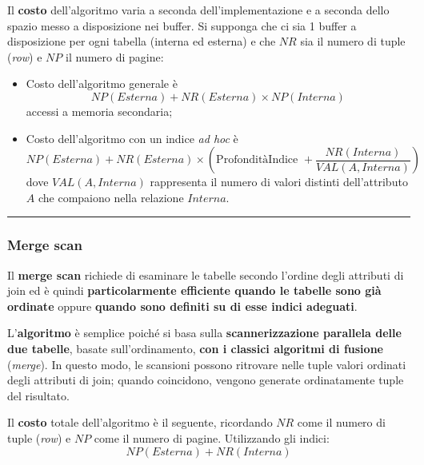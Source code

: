 \documentclass[a4paper]{article}
\newcommand{\longline}{\noindent\rule{\textwidth}{0.4pt}}
\begin{document}
	\noindent
	Il \textbf{costo} dell'algoritmo varia a seconda dell'implementazione e a seconda dello spazio messo a disposizione nei buffer. Si supponga che ci sia 1 buffer a disposizione per ogni tabella (interna ed esterna) e che $NR$ sia il numero di tuple (\emph{row}) e $NP$ il numero di pagine:
	\begin{itemize}
		\item Costo dell'algoritmo generale è
		\begin{equation*}
			NP\left(Esterna\right) + NR\left(Esterna\right) \times NP\left(Interna\right)
		\end{equation*}
		accessi a memoria secondaria;
		
		\item Costo dell'algoritmo con un indice \emph{ad hoc} è
		\begin{equation*}
			NP\left(Esterna\right) + NR\left(Esterna\right) \times \left(\text{ProfonditàIndice } + \dfrac{NR\left(Interna\right)}{VAL\left(A,Interna\right)}\right)
		\end{equation*}
		dove $VAL\left(A,Interna\right)$ rappresenta il numero di valori distinti dell'attributo $A$ che compaiono nella relazione $Interna$.
	\end{itemize}

	\longline
	
	\subsubsection{Merge scan}
	
	Il \textcolor{Red3}{\textbf{merge scan}} richiede di esaminare le tabelle secondo l'ordine degli attributi di join ed è quindi \textbf{particolarmente efficiente quando le tabelle sono già ordinate} oppure \textbf{quando sono definiti su di esse indici adeguati}.\newline
	
	\noindent
	L'\textbf{algoritmo} è semplice poiché si basa sulla \textbf{scannerizzazione parallela delle due tabelle}, basate sull'ordinamento, \textbf{con i classici algoritmi di fusione} (\emph{merge}). In questo modo, le scansioni possono ritrovare nelle tuple valori ordinati degli attributi di join; quando coincidono, vengono generate ordinatamente tuple del risultato.\newline
	
	\noindent
	Il \textbf{costo} totale dell'algoritmo è il seguente, ricordando $NR$ come il numero di tuple (\emph{row}) e $NP$ come il numero di pagine. Utilizzando gli indici:
	\begin{equation*}
		NP\left(Esterna\right) + NR\left(Interna\right)
	\end{equation*}\newpage
	
\end{document}
